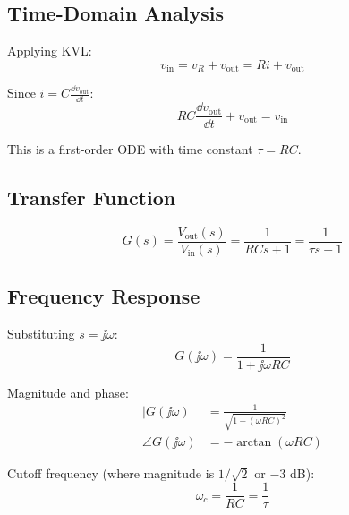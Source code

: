 

\subsection{Time-Domain Analysis}

Applying KVL:
\begin{equation}
v_{\text{in}} = v_R + v_{\text{out}} = Ri + v_{\text{out}}
\end{equation}

Since $i = C\frac{\dd v_{\text{out}}}{\dd t}$:
\begin{equation}
\boxed{RC\frac{\dd v_{\text{out}}}{\dd t} + v_{\text{out}} = v_{\text{in}}}
\end{equation}

This is a first-order ODE with time constant $\tau = RC$.

\subsection{Transfer Function}

\begin{equation}
G(s) = \frac{V_{\text{out}}(s)}{V_{\text{in}}(s)} = \frac{1}{RCs + 1} = \frac{1}{\tau s + 1}
\end{equation}

\subsection{Frequency Response}

Substituting $s = \jj\omega$:
\begin{equation}
G(\jj\omega) = \frac{1}{1 + \jj\omega RC}
\end{equation}

Magnitude and phase:
\begin{align}
|G(\jj\omega)| &= \frac{1}{\sqrt{1 + (\omega RC)^2}} \\
\angle G(\jj\omega) &= -\arctan(\omega RC)
\end{align}

Cutoff frequency (where magnitude is $1/\sqrt{2}$ or $-3$ dB):
\begin{equation}
\omega_c = \frac{1}{RC} = \frac{1}{\tau}
\end{equation}

